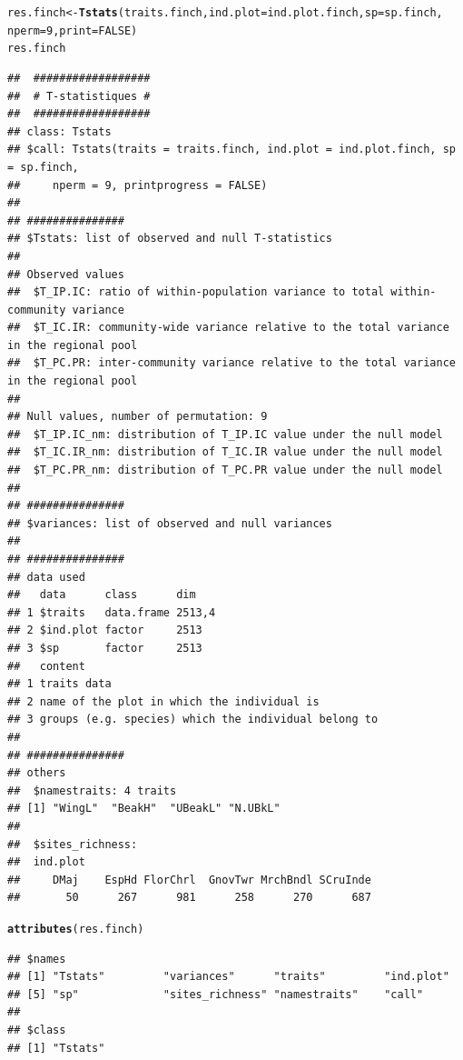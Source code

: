 \documentclass[12pt]{article}\usepackage[]{graphicx}\usepackage[]{color}
\makeatletter
\newcommand{\hlnum}[1]{\textcolor[rgb]{0.686,0.059,0.569}{#1}}%
\newcommand{\hlstd}[1]{\textcolor[rgb]{0.345,0.345,0.345}{#1}}%
\newcommand{\hlkwb}[1]{\textcolor[rgb]{0.69,0.353,0.396}{#1}}%
\newcommand{\hlkwc}[1]{\textcolor[rgb]{0.333,0.667,0.333}{#1}}%
\newcommand{\hlkwd}[1]{\textcolor[rgb]{0.737,0.353,0.396}{\textbf{#1}}}%
\newenvironment{kframe}{%
 \def\at@end@of@kframe{}%
 \ifinner\ifhmode%
  \def\at@end@of@kframe{\end{minipage}}%
  \begin{minipage}{\columnwidth}%
 \fi\fi%
 \def\FrameCommand##1{\hskip\@totalleftmargin \hskip-\fboxsep
 \colorbox{shadecolor}{##1}\hskip-\fboxsep
     \hskip-\linewidth \hskip-\@totalleftmargin \hskip\columnwidth}%
 \MakeFramed {\advance\hsize-\width
   \@totalleftmargin\z@ \linewidth\hsize
   \@setminipage}}%
 {\par\unskip\endMakeFramed%
 \at@end@of@kframe}
\newenvironment{knitrout}{}{} %
\makeatother
\begin{document}
\begin{knitrout}
\color{fgcolor}\begin{kframe}
\begin{alltt}
\hlstd{res.finch}\hlkwb{<-}\hlkwd{Tstats}\hlstd{(traits.finch,} \hlkwc{ind.plot}\hlstd{=ind.plot.finch,} \hlkwc{sp}\hlstd{=sp.finch,}
                  \hlkwc{nperm}\hlstd{=}\hlnum{9}\hlstd{,} \hlkwc{print}\hlstd{=}\hlnum{FALSE}\hlstd{)}
\hlstd{res.finch}
\end{alltt}
\begin{verbatim}
## 	##################
## 	# T-statistiques #
## 	##################
## class: Tstats
## $call: Tstats(traits = traits.finch, ind.plot = ind.plot.finch, sp = sp.finch, 
##     nperm = 9, printprogress = FALSE)
## 
## ###############
## $Tstats: list of observed and null T-statistics
## 
## Observed values
## 	$T_IP.IC: ratio of within-population variance to total within-community variance
## 	$T_IC.IR: community-wide variance relative to the total variance in the regional pool
## 	$T_PC.PR: inter-community variance relative to the total variance in the regional pool
## 
## Null values, number of permutation: 9
## 	$T_IP.IC_nm: distribution of T_IP.IC value under the null model
## 	$T_IC.IR_nm: distribution of T_IC.IR value under the null model
## 	$T_PC.PR_nm: distribution of T_PC.PR value under the null model
## 
## ###############
## $variances: list of observed and null variances
## 
## ###############
## data used
##   data      class      dim   
## 1 $traits   data.frame 2513,4
## 2 $ind.plot factor     2513  
## 3 $sp       factor     2513  
##   content                                             
## 1 traits data                                         
## 2 name of the plot in which the individual is         
## 3 groups (e.g. species) which the individual belong to
## 
## ###############
## others
## 	$namestraits: 4 traits
## [1] "WingL"  "BeakH"  "UBeakL" "N.UBkL"
## 
## 	$sites_richness:
## 	ind.plot
##     DMaj    EspHd FlorChrl  GnovTwr MrchBndl SCruInde 
##       50      267      981      258      270      687
\end{verbatim}
\begin{alltt}
\hlkwd{attributes}\hlstd{(res.finch)}
\end{alltt}
\begin{verbatim}
## $names
## [1] "Tstats"         "variances"      "traits"         "ind.plot"      
## [5] "sp"             "sites_richness" "namestraits"    "call"          
## 
## $class
## [1] "Tstats"
\end{verbatim}

\end{kframe}
\end{knitrout}
\end{document}
